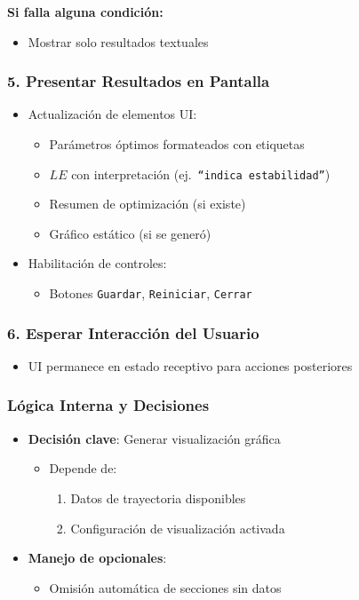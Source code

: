 \textbf{Si falla alguna condición:}
\begin{itemize}
    \item Mostrar solo resultados textuales
\end{itemize}

\subsubsection*{5. Presentar Resultados en Pantalla}
\begin{itemize}
    \item Actualización de elementos UI:\
    \begin{itemize}
        \item Parámetros óptimos formateados con etiquetas
        \item $LE$ con interpretación (ej.\ \texttt{``indica estabilidad''})
        \item Resumen de optimización (si existe)
        \item Gráfico estático (si se generó)
    \end{itemize}
    \item Habilitación de controles:
    \begin{itemize}
        \item Botones \texttt{Guardar}, \texttt{Reiniciar}, \texttt{Cerrar}
    \end{itemize}
\end{itemize}

\subsubsection*{6. Esperar Interacción del Usuario}
\begin{itemize}
    \item UI permanece en estado receptivo para acciones posteriores
\end{itemize}

\subsubsection{Lógica Interna y Decisiones}
\begin{itemize}
    \item \textbf{Decisión clave}: Generar visualización gráfica
    \begin{itemize}
        \item Depende de:
        \begin{enumerate}[label=~(\alph*)]
            \item Datos de trayectoria disponibles
            \item Configuración de visualización activada
        \end{enumerate}
    \end{itemize}
    \item \textbf{Manejo de opcionales}:
    \begin{itemize}
        \item Omisión automática de secciones sin datos
    \end{itemize}
\end{itemize}

